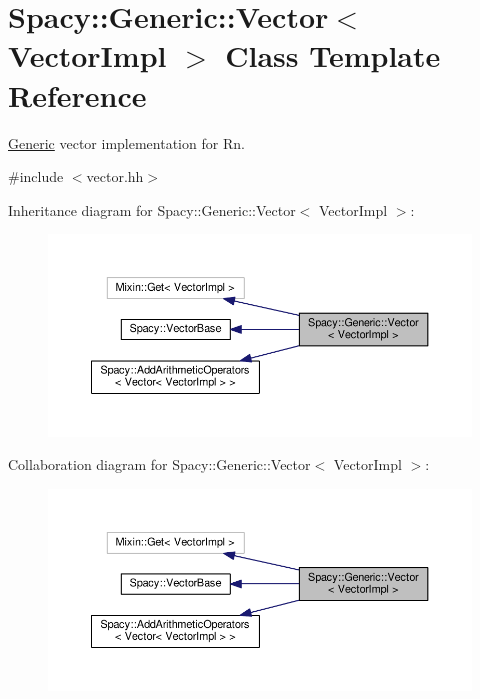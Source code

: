 \hypertarget{classSpacy_1_1Generic_1_1Vector}{\section{Spacy\-:\-:Generic\-:\-:Vector$<$ Vector\-Impl $>$ Class Template Reference}
\label{classSpacy_1_1Generic_1_1Vector}
}


\hyperlink{namespaceSpacy_1_1Generic}{Generic} vector implementation for Rn.  




{\ttfamily \#include $<$vector.\-hh$>$}



Inheritance diagram for Spacy\-:\-:Generic\-:\-:Vector$<$ Vector\-Impl $>$\-:
\nopagebreak
\begin{figure}[H]
\begin{center}
\leavevmode
\includegraphics[width=350pt]{classSpacy_1_1Generic_1_1Vector__inherit__graph}
\end{center}
\end{figure}


Collaboration diagram for Spacy\-:\-:Generic\-:\-:Vector$<$ Vector\-Impl $>$\-:
\nopagebreak
\begin{figure}[H]
\begin{center}
\leavevmode
\includegraphics[width=350pt]{classSpacy_1_1Generic_1_1Vector__coll__graph}
\end{center}
\end{figure}
